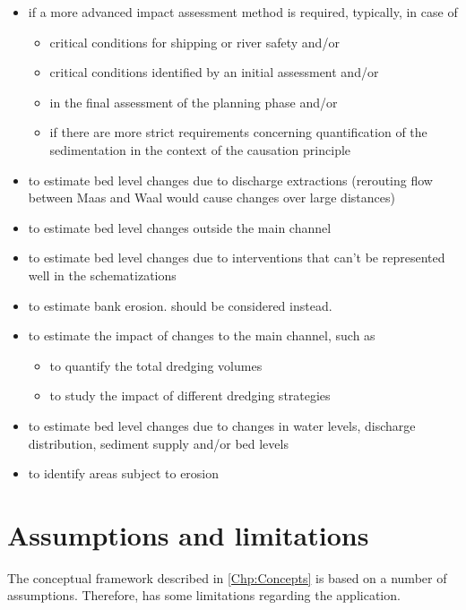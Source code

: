 \begin{itemize}
\item if a more advanced impact assessment method is required, typically, in case of
\begin{itemize}
\item critical conditions for shipping or river safety and/or
\item critical conditions identified by an initial \dfmi assessment and/or
\item in the final assessment of the planning phase and/or
\item if there are more strict requirements concerning quantification of the sedimentation in the context of the causation principle
\end{itemize}
\item to estimate bed level changes due to discharge extractions (rerouting flow between Maas and Waal would cause changes over large distances)
\item to estimate bed level changes outside the main channel
\item to estimate bed level changes due to interventions that can't be represented well in the \dflowfm schematizations
\item to estimate bank erosion. \dfastbe should be considered instead.
\item to estimate the impact of changes to the main channel, such as
\begin{itemize}
\item to quantify the total dredging volumes
\item to study the impact of different dredging strategies
\end{itemize}
\item to estimate bed level changes due to changes in water levels, discharge distribution, sediment supply and/or bed levels
\item to identify areas subject to erosion
\end{itemize}


\section{Assumptions and limitations}\label{Sec:Limitations}

The conceptual framework described in \autoref{Chp:Concepts} is based on a number of assumptions.
Therefore, \dfmi has some limitations regarding the application.

